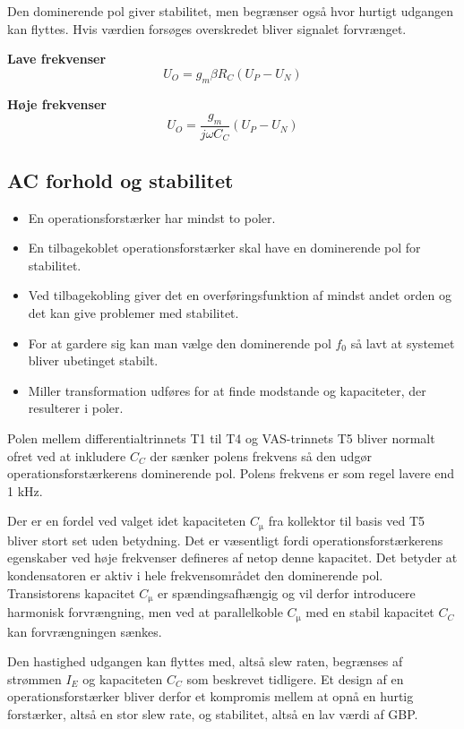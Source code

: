 \documentclass[danish]{article}
\begin{document}
Den dominerende pol giver stabilitet, men begrænser også hvor hurtigt udgangen kan flyttes. Hvis værdien forsøges overskredet bliver signalet forvrænget.

\textbf{Lave frekvenser}
\begin{equation} 
U_O = g_m \beta R_C(U_P-U_N)
\end{equation}

\textbf{Høje frekvenser}
\begin{equation} 
U_O = \frac{g_m}{j \omega C_C}(U_P-U_N)
\end{equation}

\subsection{AC forhold og stabilitet}
\begin{itemize}
	\item En operationsforstærker har mindst to poler.
	\item En tilbagekoblet operationsforstærker skal have en dominerende pol for stabilitet.
	\item Ved tilbagekobling giver det en overføringsfunktion af mindst andet orden og det kan give problemer med stabilitet.
	\item For at gardere sig kan man vælge den dominerende pol $f_0$ så lavt at systemet bliver ubetinget stabilt.
	\item Miller transformation udføres for at finde modstande og kapaciteter, der resulterer i poler.
\end{itemize}

Polen mellem differentialtrinnets T1 til T4 og VAS-trinnets T5 bliver normalt ofret ved at inkludere $C_C$ der sænker polens frekvens så den udgør operationsforstærkerens dominerende pol. Polens frekvens er som regel lavere end 1 kHz. 

Der er en fordel ved valget idet kapaciteten $C_{\si{\micro}}$ fra kollektor til basis ved T5 bliver stort set uden betydning. 
Det er væsentligt fordi operationsforstærkerens egenskaber ved høje frekvenser defineres af netop denne kapacitet.
Det betyder at kondensatoren er aktiv i hele frekvensområdet den dominerende pol. 
Transistorens kapacitet $C_{\si{\micro}}$ er spændingsafhængig og vil derfor introducere harmonisk forvrængning, men ved at parallelkoble $C_{\si{\micro}}$ med en stabil kapacitet $C_C$ kan forvrængningen sænkes. 


Den hastighed udgangen kan flyttes med, altså slew raten, begrænses af strømmen $I_E$ og kapaciteten $C_C$ som beskrevet tidligere. 
Et design af en operationsforstærker bliver derfor et kompromis mellem at opnå en hurtig forstærker, altså en stor slew rate, og stabilitet, altså en lav værdi af GBP. 
\end{document}
